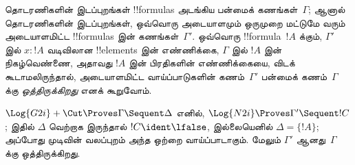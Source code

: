 \documentclass[../../../include/open-logic-section]{subfiles}
\begin{document}


 தொடரணிகளின் இடப்புறங்கள் !!{formula}s அடங்கிய
பன்மைக் கணங்கள்~$\Gamma$; ஆனால்  தொடரணிகளின்
இடப்புறங்கள், ஒவ்வொரு அடையாளமும் ஒருமுறை மட்டுமே வரும்
அடையாளமிட்ட !!{formula}s இன் கணங்கள்~$\Gamma'$. ஒவ்வொரு
!!{formula}~$!A$ க்கும், $\Gamma'$ இல் $x : !A$ வடிவிலான
!!{element}s இன் எண்ணிக்கை, $\Gamma$ இல் $!A$ இன்
நிகழ்வெண்ணை, அதாவது $!A$ இன் பிரதிகளின் எண்ணிக்கையை,
விடக் கூடாமலிருந்தால், அடையாளமிட்ட வாய்ப்பாடுகளின்
கணம்~$\Gamma'$ பன்மைக் கணம்~$\Gamma$ க்கு
\emph{ஒத்திருக்கிறது} எனக் கூறுவோம்.

\begin{prop}
$\Log{G2i} + \Cut \Proves \Gamma \Sequent \Delta$ எனில்,
$\Log{N2i} \Proves \Gamma' \Sequent !C$; இதில் $\Delta$
வெற்றாக இருந்தால் $!C \ident \lfalse$, இல்லையெனில்
$\Delta = \{!A\}$; அப்போது முடிவின் வலப்புறம் அந்த
ஒற்றை வாய்ப்பாடாகும். மேலும் $\Gamma'$ ஆனது~$\Gamma$ க்கு
ஒத்திருக்கிறது.
\end{prop}
\end{document}

